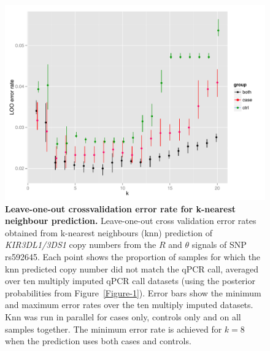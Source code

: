 \begin{figure}[h!]
  \centering
  \includegraphics[scale=.5]{KIR/figures/Figure-3.pdf}
  \caption{ \label{Figure-3}
  \textbf{Leave-one-out crossvalidation error rate for k-nearest neighbour prediction.}
  Leave-one-out cross validation error rates
  obtained from k-nearest neighbours (knn) prediction
  of \emph{KIR3DL1/3DS1} copy numbers from the $R$ and $\theta$ signals of SNP rs592645.
  Each point shows the proportion of samples for which the knn predicted copy number did not 
  match the qPCR call, averaged over ten multiply imputed qPCR call datasets
  (using the posterior probabilities from Figure~\ref{Figure-1}). 
  Error bars show the minimum and maximum error rates over the ten multiply imputed datasets.
  Knn was run in parallel for cases only, controls only and on all samples together.
  The minimum error rate is achieved for $k=8$ when the prediction uses both cases and controls.}
\end{figure}

